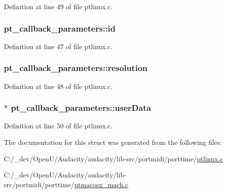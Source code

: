 Definition at line 49 of file ptlinux.\+c.

\subsubsection[{\texorpdfstring{id}{id}}]{ pt\+\_\+callback\+\_\+parameters\+::id}\hypertarget{structpt__callback__parameters_aacadd50758ca9ababae9a1db0b6cbc63}{}\label{structpt__callback__parameters_aacadd50758ca9ababae9a1db0b6cbc63}


Definition at line 47 of file ptlinux.\+c.

\subsubsection[{\texorpdfstring{resolution}{resolution}}]{ pt\+\_\+callback\+\_\+parameters\+::resolution}\hypertarget{structpt__callback__parameters_a6fbc94070203cea7f70c85f2fe1b205c}{}\label{structpt__callback__parameters_a6fbc94070203cea7f70c85f2fe1b205c}


Definition at line 48 of file ptlinux.\+c.

\subsubsection[{\texorpdfstring{user\+Data}{userData}}]{ $\ast$ pt\+\_\+callback\+\_\+parameters\+::user\+Data}\hypertarget{structpt__callback__parameters_ade1aadaf39085d58efdbca011bdd8ed3}{}\label{structpt__callback__parameters_ade1aadaf39085d58efdbca011bdd8ed3}


Definition at line 50 of file ptlinux.\+c.



The documentation for this struct was generated from the following files\+:\begin{DoxyCompactItemize}
\item 
C\+:/\+\_\+dev/\+Open\+U/\+Audacity/audacity/lib-\/src/portmidi/porttime/\hyperlink{ptlinux_8c}{ptlinux.\+c}\item 
C\+:/\+\_\+dev/\+Open\+U/\+Audacity/audacity/lib-\/src/portmidi/porttime/\hyperlink{ptmacosx__mach_8c}{ptmacosx\+\_\+mach.\+c}\end{DoxyCompactItemize}
